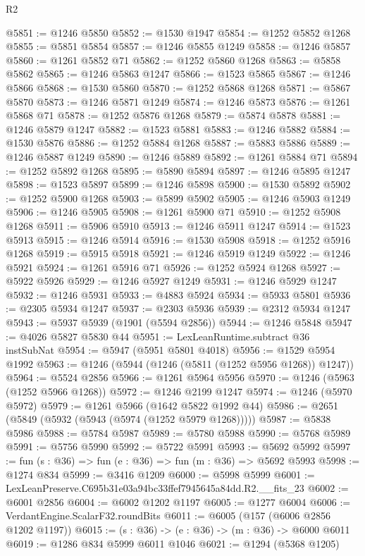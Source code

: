 \begin{lexlean}{R2}
\begin{coremodule}
@5851 := @1246 @5850
@5852 := @1530 @1947
@5854 := @1252 @5852 @1268
@5855 := @5851 @5854
@5857 := @1246 @5855 @1249
@5858 := @1246 @5857
@5860 := @1261 @5852 @71
@5862 := @1252 @5860 @1268
@5863 := @5858 @5862
@5865 := @1246 @5863 @1247
@5866 := @1523 @5865
@5867 := @1246 @5866
@5868 := @1530 @5860
@5870 := @1252 @5868 @1268
@5871 := @5867 @5870
@5873 := @1246 @5871 @1249
@5874 := @1246 @5873
@5876 := @1261 @5868 @71
@5878 := @1252 @5876 @1268
@5879 := @5874 @5878
@5881 := @1246 @5879 @1247
@5882 := @1523 @5881
@5883 := @1246 @5882
@5884 := @1530 @5876
@5886 := @1252 @5884 @1268
@5887 := @5883 @5886
@5889 := @1246 @5887 @1249
@5890 := @1246 @5889
@5892 := @1261 @5884 @71
@5894 := @1252 @5892 @1268
@5895 := @5890 @5894
@5897 := @1246 @5895 @1247
@5898 := @1523 @5897
@5899 := @1246 @5898
@5900 := @1530 @5892
@5902 := @1252 @5900 @1268
@5903 := @5899 @5902
@5905 := @1246 @5903 @1249
@5906 := @1246 @5905
@5908 := @1261 @5900 @71
@5910 := @1252 @5908 @1268
@5911 := @5906 @5910
@5913 := @1246 @5911 @1247
@5914 := @1523 @5913
@5915 := @1246 @5914
@5916 := @1530 @5908
@5918 := @1252 @5916 @1268
@5919 := @5915 @5918
@5921 := @1246 @5919 @1249
@5922 := @1246 @5921
@5924 := @1261 @5916 @71
@5926 := @1252 @5924 @1268
@5927 := @5922 @5926
@5929 := @1246 @5927 @1249
@5931 := @1246 @5929 @1247
@5932 := @1246 @5931
@5933 := @4883 @5924
@5934 := @5933 @5801
@5936 := @2305 @5934 @1247
@5937 := @2303 @5936
@5939 := @2312 @5934 @1247
@5943 := @5937 @5939 (@1901 (@5594 @2856))
@5944 := @1246 @5848
@5947 := @4026 @5827 @5830 @44
@5951 := LexLeanRuntime.subtract @36 instSubNat
@5954 := @5947 (@5951 @5801 @4018)
@5956 := @1529 @5954 @1992
@5963 := @1246 (@5944 (@1246 (@5811 (@1252 @5956 @1268)) @1247))
@5964 := @5524 @2856
@5966 := @1261 @5964 @5956
@5970 := @1246 (@5963 (@1252 @5966 @1268))
@5972 := @1246 @2199 @1247
@5974 := @1246 (@5970 @5972)
@5979 := @1261 @5966 (@1642 @5822 @1992 @44)
@5986 := @2651 (@5849 (@5932 (@5943 (@5974 (@1252 @5979 @1268)))))
@5987 := @5838 @5986
@5988 := @5784 @5987
@5989 := @5780 @5988
@5990 := @5768 @5989
@5991 := @5756 @5990
@5992 := @5722 @5991
@5993 := @5692 @5992
@5997 := fun (s : @36) => fun (e : @36) => fun (m : @36) => @5692 @5993
@5998 := @1274 @834
@5999 := @3416 @1209
@6000 := @5998 @5999
@6001 := LexLeanPreserve.C695b31e03a94bc33ffef7945645a84dd.R2.__fits_23
@6002 := @6001 @2856
@6004 := @6002 @1202 @1197
@6005 := @1277 @6004
@6006 := VerdantEngine.ScalarF32.roundBits
@6011 := @6005 (@157 (@6006 @2856 @1202 @1197))
@6015 := (s : @36) -> (e : @36) -> (m : @36) -> @6000 @6011
@6019 := @1286 @834 @5999 @6011 @1046
@6021 := @1294 (@5368 @1205)

\end{coremodule}
\end{lexlean}
